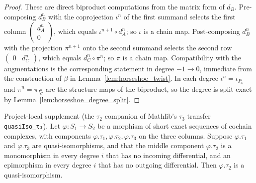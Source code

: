 \begin{proof}
  These are direct biproduct computations from the matrix form of \(d_B\). Pre-composing
  \(d_B^n\) with the coprojection \(\iota^n\) of the first summand selects the first
  column \(\begin{pmatrix} d_A^n \\ 0\end{pmatrix}\), which equals
  \(\iota^{n+1} \circ d_A^n\); so \(\iota\) is a chain map. Post-composing \(d_B^n\) with
  the projection \(\pi^{n+1}\) onto the second summand selects the second row
  \(\begin{pmatrix} 0 & d_C^n\end{pmatrix}\), which equals \(d_C^n \circ \pi^n\); so
  \(\pi\) is a chain map. Compatibility with the augmentations is the corresponding
  statement in degree \(-1 \to 0\), immediate from the construction of \(\beta\) in
  Lemma~\ref{lem:horseshoe_twist}. In each degree \(\iota^n = \iota_{I_A^n}\) and
  \(\pi^n = \pi_{I_C^n}\) are the structure maps of the biproduct, so the degree is split
  exact by Lemma~\ref{lem:horseshoe_degree_split}.
\end{proof}

\begin{lemma}\leanok
  \label{lem:quasiIso_tau2}
  Project-local supplement (the \(\tau_2\) companion of Mathlib's \(\tau_3\) transfer
  \texttt{quasiIso\_τ₃}). Let \(\varphi : S_1 \to S_2\) be a morphism of short exact
  sequences of cochain complexes, with components \(\varphi.\tau_1, \varphi.\tau_2,
  \varphi.\tau_3\) on the three columns. Suppose \(\varphi.\tau_1\) and \(\varphi.\tau_3\)
  are quasi-isomorphisms, and that the middle component \(\varphi.\tau_2\) is a
  monomorphism in every degree \(i\) that has no incoming differential, and an
  epimorphism in every degree \(i\) that has no outgoing differential. Then
  \(\varphi.\tau_2\) is a quasi-isomorphism.
\end{lemma}

